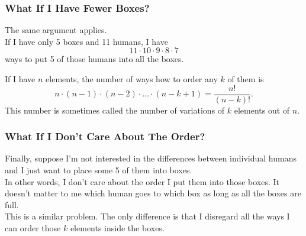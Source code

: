 \documentclass[aspectratio=169,11pt,usenames,dvipsnames,handout]{beamer}
\begin{document}
\begin{frame}
\begin{center}
 \end{center}
\end{frame}

\begin{frame}
 \frametitle{What If I Have Fewer Boxes?}
 The same argument applies.\\ \pause
 If I have only 5 boxes and 11 humans, I have
 \[
  11 \cdot 10 \cdot 9 \cdot 8 \cdot 7
 \]
 ways to put 5 of those humans into all the boxes.\pause
 \begin{tcolorbox}[title=Variations]
  If I have $n$ elements, the number of ways how to order any $k$ of them is
  \[
   n \cdot (n-1) \cdot (n-2) \cdot \ldots \cdot (n-k+1) = \frac{n!}{(n-k)!}.
  \]
  This number is sometimes called the number of \alert{variations} of $k$
  elements out of $n$.
 \end{tcolorbox}
\end{frame}

\begin{frame}
 \frametitle{What If I Don't Care About The Order?}
 Finally, suppose I'm not interested in the differences between individual
 humans and I just want to place some 5 of them into boxes.\\ \pause
 In other words, I don't care about the order I put them into those boxes. It
 doesn't matter to me which human goes to which box as long as all the boxes are
 full.\\ \pause
 This is a similar problem. The only difference is that I disregard all the ways
 I can order those $k$ elements inside the boxes.
\end{frame}
\end{document}
